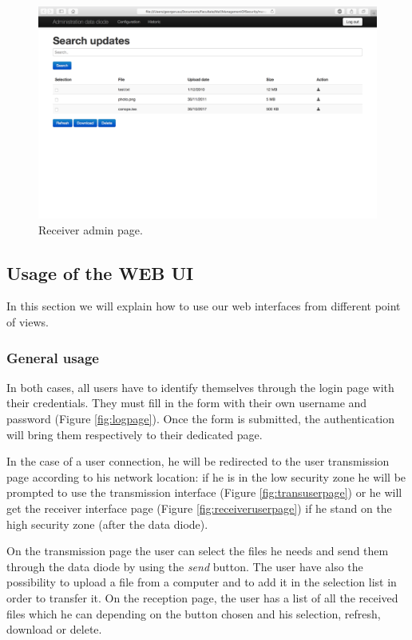 \documentclass[a4paper,10pt]{article}
\begin{document}
\begin{figure}[!h]
\centering
\includegraphics[scale=0.35]{images/adminreceiver.png}
\caption{Receiver admin page.}
\label{fig:receiveradminpage}
\end{figure}
\clearpage
\subsection{Usage of the WEB UI}
In this section we will explain how to use our web interfaces from different point of views.
\subsubsection{General usage}
In both cases, all users have to identify themselves through the login page with their credentials. They must fill in the form with their own username and password (Figure \ref{fig:logpage}). Once the form is submitted, the authentication will bring them respectively to their dedicated page.\bigskip 

In the case of a user connection, he will be redirected to the user transmission page according to his network location: if he is in the low security zone he will be prompted to use the transmission interface (Figure \ref{fig:transuserpage}) or he will get the receiver interface page (Figure \ref{fig:receiveruserpage}) if he stand on the high security zone (after the data diode). 

On the transmission page the user can select the files he needs and send them through the data diode by using the \textit{send} button. The user have also the possibility to upload a file from a computer and to add it in the selection list in order to transfer it. On the reception page, the user has a list of all the received files which he can depending on the button chosen and his selection, refresh, download or delete.\bigskip 
\end{document}
